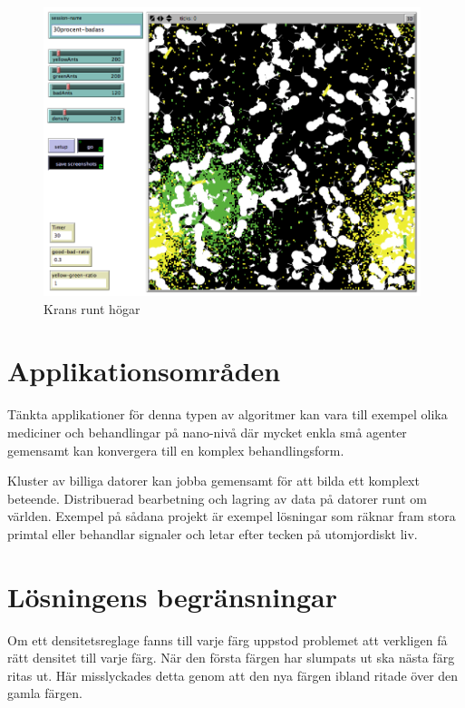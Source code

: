 \documentclass[titlepage, a4paper, 12pt]{article}
\begin{document}
\begin{figure}[H]
  \begin{center}
    \includegraphics[width=110mm]{images/scatter.png}
    \caption{Krans runt högar}
    \label{fig:scatter}
  \end{center}
\end{figure}
\section{Applikationsområden}

Tänkta applikationer för denna typen av algoritmer kan vara till
exempel olika mediciner och behandlingar på nano-nivå där mycket enkla
små agenter gemensamt kan konvergera till en komplex behandlingsform.

Kluster av billiga datorer kan jobba gemensamt för att bilda ett
komplext beteende. Distribuerad bearbetning och lagring av data på
datorer runt om världen. Exempel på sådana projekt är exempel
lösningar som räknar fram stora primtal eller behandlar signaler och
letar efter tecken på utomjordiskt liv.

\section{Lösningens begränsningar}
Om ett densitetsreglage fanns till varje färg uppstod problemet att
verkligen få rätt densitet till varje färg. När den första färgen har
slumpats ut ska nästa färg ritas ut. Här misslyckades detta genom att
den nya färgen ibland ritade över den gamla färgen.
\end{document}
